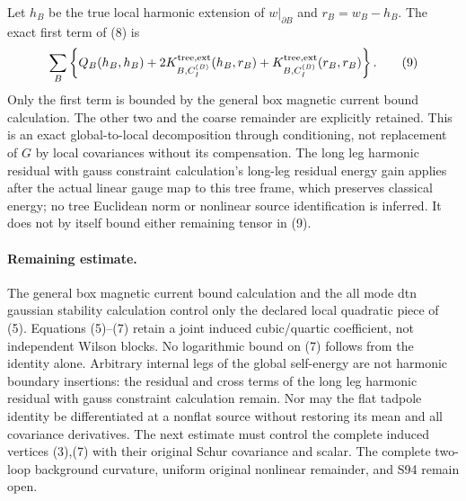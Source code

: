 \documentclass[11pt]{article}
\begin{document}
Let $h_B$ be the true local harmonic extension of $w|_{\partial B}$
and $r_B=w_B-h_B$. The exact first term of (8) is
\[
 \sum_B\left\{Q_B(h_B,h_B)
   +2K_{B,C_I^{(B)}}^{\rm tree,ext}(h_B,r_B)
   +K_{B,C_I^{(B)}}^{\rm tree,ext}(r_B,r_B)\right\}. \tag{9}
\]
Only the first term is bounded by the general box magnetic current bound calculation. The other two and the
coarse remainder are explicitly retained. This is an exact global-to-local
decomposition through conditioning, not replacement of $G$ by local
covariances without its compensation. The long leg harmonic residual with gauss constraint calculation's long-leg residual
energy gain applies after the actual linear gauge map to this tree
frame, which preserves classical energy; no tree Euclidean norm or
nonlinear source identification is inferred. It does not by itself
bound either remaining tensor in (9).

\paragraph{Remaining estimate.}
The general box magnetic current bound calculation and the all mode dtn gaussian stability calculation control only the declared local quadratic
piece of (5). Equations (5)--(7) retain a joint induced cubic/quartic
coefficient, not independent Wilson blocks. No logarithmic bound on
(7) follows from the identity alone. Arbitrary internal legs of the
global self-energy are not harmonic boundary insertions: the residual
and cross terms of the long leg harmonic residual with gauss constraint calculation remain. Nor may the flat tadpole identity
be differentiated at a nonflat source without restoring its mean and
all covariance derivatives. The next estimate must control the complete
induced vertices (3),(7) with their original Schur covariance and scalar.
The complete two-loop background curvature, uniform original nonlinear
remainder, and S94 remain open.
\end{document}

